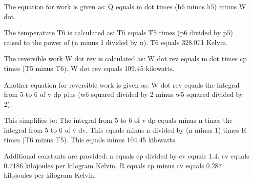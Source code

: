 The equation for work is given as:  
Q equals m dot times (h6 minus h5) minus W dot.  

The temperature T6 is calculated as:  
T6 equals T5 times (p6 divided by p5) raised to the power of (n minus 1 divided by n).  
T6 equals 328.071 Kelvin.  

The reversible work W dot rev is calculated as:  
W dot rev equals m dot times cp times (T5 minus T6).  
W dot rev equals 109.45 kilowatts.  

Another equation for reversible work is given as:  
W dot rev equals the integral from 5 to 6 of v dp plus (w6 squared divided by 2 minus w5 squared divided by 2).  

This simplifies to:  
The integral from 5 to 6 of v dp equals minus n times the integral from 5 to 6 of v dv.  
This equals minus n divided by (n minus 1) times R times (T6 minus T5).  
This equals minus 104.45 kilowatts.  

Additional constants are provided:  
n equals cp divided by cv equals 1.4.  
cv equals 0.7186 kilojoules per kilogram Kelvin.  
R equals cp minus cv equals 0.287 kilojoules per kilogram Kelvin.